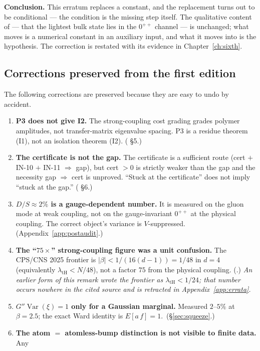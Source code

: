 \textbf{Conclusion.} This erratum replaces a constant, and the replacement turns out to be
conditional --- the condition is the missing step itself. The qualitative content of 
--- that the lightest bulk state lies in the $0^{++}$ channel --- is unchanged; what moves is a
numerical constant in an auxiliary input, and what it moves into is the hypothesis. The correction
is restated with its evidence in Chapter~\ref{ch:sixth}.

\subsection{Corrections preserved from the first edition}

The following corrections are preserved because they are easy to undo by accident.
\begin{enumerate}
\item \textbf{P3 does not give I2.} The strong-coupling cost grading grades polymer amplitudes,
  not transfer-matrix eigenvalue spacing. P3 is a residue theorem (I1), not an isolation
  theorem (I2). ( \S5.)
\item \textbf{The certificate is not the gap.} The certificate is a sufficient route
  (cert $+$ IN-10 $+$ IN-11 $\Rightarrow$ gap), but cert $>0$ is strictly weaker than the gap and
  the necessity gap $\Rightarrow$ cert is unproved. ``Stuck at the certificate'' does not imply
  ``stuck at the gap.'' ( \S6.)
\item \textbf{$D/S\approx2\%$ is a gauge-dependent number.} It is measured on the gluon mode at
  weak coupling, not on the gauge-invariant $0^{++}$ at the physical coupling. The correct
  object's variance is $V$-suppressed. (Appendix~\ref{app:postaudit}.)
\item \textbf{The ``$75\times$'' strong-coupling figure was a unit confusion.} The CPS/CNS 2025
  frontier is $\lvert\beta\rvert<1/(16(d-1))=1/48$ in $d=4$ (equivalently
  $\lambda_{\mathrm{tH}}<N/48$), not a factor $75$ from the physical coupling.
  (.) \emph{An earlier form of this remark wrote the frontier as
  $\lambda_{\mathrm{tH}}<1/24$; that number occurs nowhere in the cited source and is retracted
  in Appendix~\ref{app:errata}.}
\item \textbf{$G''\operatorname{Var}(\xi)=1$ only for a Gaussian marginal.} Measured $2$--$5\%$
  at $\beta=2.5$; the exact Ward identity is $E[a\,f]=1$.\ (\S\ref{sec:squeeze}.)
\item \textbf{The atom $=$ atomless-bump distinction is not visible to finite data.} Any

\end{enumerate}
